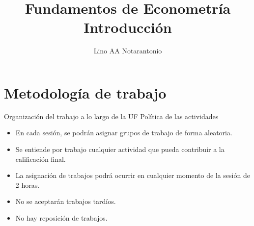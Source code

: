 \documentclass[11pt,handout]{beamer}
\author{Lino AA Notarantonio}
\title{Fundamentos de Econometr\'ia \\ Introducción}
\begin{document}
\begin{frame}
\titlepage
\end{frame}




\section{Metodología de trabajo}


\begin{frame}{Organización del trabajo a lo largo de la UF}
{Política de las actividades}

\begin{itemize}
	\item En cada sesión,  se podrán asignar grupos de trabajo de forma aleatoria. 

	\item Se entiende por trabajo cualquier actividad que pueda contribuir a la calificación final. 

	\item La asignación de trabajos podrá ocurrir en cualquier momento de la sesión de 2 horas. 
	
	\item No se aceptarán trabajos tardíos.
	
	\item No hay reposición de trabajos.  
\end{itemize}

\end{frame}
\end{document}
